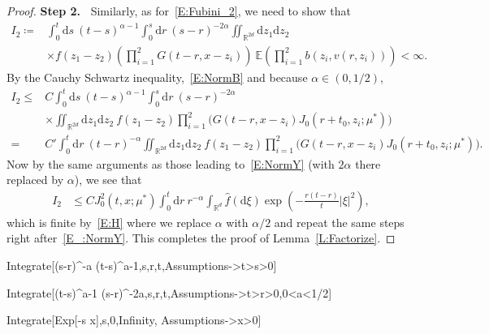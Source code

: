 \documentclass[a4paper,11pt]{article}%
\theoremstyle{plain}
\theoremstyle{definition}
\numberwithin{equation}{section}
\newcommand{\R}{\mathbb{R}}
\newcommand{\E}{\mathbb{E}}
\newcommand{\ud}{\ensuremath{\mathrm{d}}}
\begin{document}
\begin{proof}
  \textbf{\noindent Step 2.~} Similarly, as for~\eqref{E:Fubini_2}, we need to show that
  \begin{align*}
    I_2\coloneqq & \int_0^t \ud s \: (t-s)^{\alpha-1} \int_0^s \ud r\: (s-r)^{-2\alpha} \iint_{\R^{2d}} \ud z_1\ud z_2\: \\
                 & \times f(z_1-z_2) \left(\prod_{i = 1}^{2} G(t-r,x-z_i)\right) \: \E\left(\prod_{i = 1}^{2}b(z_i,v(r,z_i))\right) < \infty.
  \end{align*}
  By the Cauchy Schwartz inequality,~\eqref{E:NormB} and because $\alpha\in (0,1/2)$,
  \begin{align*}
    I_2\le & C \int_0^t \ud s \: (t-s)^{\alpha-1} \int_0^s \ud r\: (s-r)^{-2\alpha}                                                        \\
           & \times \iint_{\R^{2d}} \ud z_1\ud z_2\:f(z_1-z_2) \prod_{i = 1}^{2}\bigg(G(t-r,x-z_i) J_0\left(r + t_0,z_i;\mu^*\right)\bigg) \\
         = & C' \int_0^t \ud r \: (t-r)^{-\alpha} \iint_{\R^{2d}} \ud z_1\ud z_2\:f(z_1-z_2) \prod_{i = 1}^{2}\bigg(G(t-r,x-z_i) J_0\left(r + t_0, z_i;\mu^*\right)\bigg).
  \end{align*}
  Now by the same arguments as those leading to~\eqref{E:NormY} (with $2\alpha$ there replaced by
  $\alpha$), we see that
  \begin{align*}
    I_2 & \le C J_0^2\left(t,x; \mu^*\right) \int_0^t \ud r \: r^{-\alpha} \int_{\R^d} \widehat{f}(\ud \xi)\exp\left(-\frac{r(t-r)}{t}|\xi|^2\right),
  \end{align*}
  which is finite by~\eqref{E:H} where we replace $\alpha$ with $\alpha/2$ and repeat the same steps
  right after~\eqref{E_:NormY}. This completes the proof of Lemma~\ref{L:Factorize}.
\end{proof}

\begin{codes}%

Integrate[(s-r)^{-a} (t-s)^{a-1},{s,r,t},Assumptions->{t>s>0}]

Integrate[(t-s)^{a-1} (s-r)^{-2a},{s,r,t},Assumptions->{t>r>0,0<a<1/2}]

\end{codes}

\begin{codes}%

  Integrate[Exp[-s x],{s,0,Infinity}, Assumptions->x>0]

\end{codes}
\end{document}
